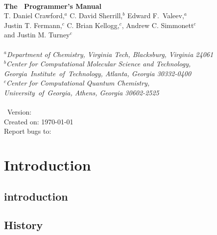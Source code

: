 \documentclass[12pt]{article}
\begin{document}


\initfuncdesc

\begin{center}
\ \\
\vspace{2.0in}
{\bf {\Large The \PSIfour\ Programmer's Manual}} \\
\vspace{0.5in} 
T. Daniel Crawford,$^a$ C. David Sherrill,$^b$ Edward F.\ Valeev,$^{a}$ \\
Justin T. Fermann,$^c$ C. Brian Kellogg,$^c$, Andrew C. Simmonett$^c$ \\
and Justin M. Turney$^c$ \\
\ \\ 
{\em $^a$Department of Chemistry, Virginia Tech, Blacksburg, Virginia 24061} \\
\vspace{0.1in}
{\em $^b$Center for Computational Molecular Science and Technology, 
\mbox{Georgia Institute of Technology,} Atlanta, Georgia 30332-0400} \\
\vspace{0.1in}
{\em $^c$Center for Computational Quantum Chemistry, \\ 
\mbox{University of Georgia,} Athens, Georgia 30602-2525} \\
\ \\
\vspace{0.3in}
\PSIfour\ Version: \PSIversion \\
Created on: \today \\
Report bugs to: \PSIemail \\
\end{center}

\thispagestyle{empty}

\newpage
\tableofcontents

\newpage

\section{Introduction}
    \subsection{introduction} \label{introduction}
    
    \subsection{History} \label{history}
    
\end{document}
